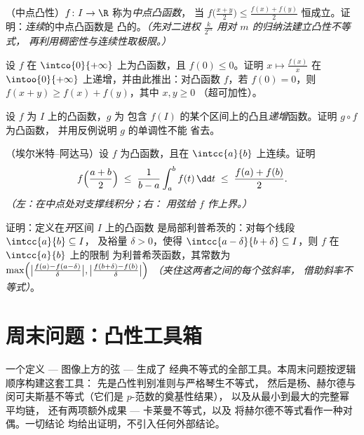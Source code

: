 \begin{exercise}[$\star\star\star$]\label{exo:b2:realfun:8}
（中点凸性）$f \colon I \to \R$ 称为\emph{中点凸函数}，
当 $f\bigl(\frac{x+y}{2}\bigr) \leq \frac{f(x) + f(y)}{2}$
恒成立。证明：\emph{连续}的中点凸函数是
凸的。\emph{（先对二进权
$\frac{k}{2^m}$ 用对 $m$ 的归纳法建立凸性不等式，
再利用稠密性与连续性取极限。）}
\end{exercise}

\begin{exercise}[$\star\star\star$]\label{exo:b2:realfun:9}
设 $f$ 在 $\intco{0}{+\infty}$ 上为凸函数，且 $f(0) \leq 0$。证明
$x \mapsto \frac{f(x)}{x}$ 在
$\intoo{0}{+\infty}$ 上递增，并由此推出：对凸函数 $f$，若 $f(0) =
0$，则 $f(x + y) \geq f(x) + f(y)$，其中 $x, y \geq 0$
（超可加性）。
\end{exercise}

\begin{exercise}[$\star$]\label{exo:b2:realfun:10}
设 $f$ 为 $I$ 上的凸函数，$g$ 为
包含 $f(I)$ 的某个区间上的凸且\emph{递增}函数。证明 $g \circ f$ 为凸函数，
并用反例说明 $g$ 的单调性不能
省去。
\end{exercise}

\begin{exercise}[$\star\star$]\label{exo:b2:realfun:11}
（埃尔米特–阿达马）设 $f$ 为凸函数，且在
$\intcc{a}{b}$ 上连续。证明
\[
f\Bigl(\frac{a+b}{2}\Bigr) \;\leq\; \frac{1}{b -
a}\int_a^b f(t)\,\dd t \;\leq\; \frac{f(a) + f(b)}{2} .
\]
\emph{（左：在中点处对支撑线积分；右：
用弦给 $f$ 作上界。）}
\end{exercise}

\begin{exercise}[$\star\star\star$]\label{exo:b2:realfun:12}
证明：定义在\emph{开}区间 $I$ 上的凸函数
是局部利普希茨的：对每个线段 $\intcc{a}{b} \subseteq I$，
及裕量 $\delta > 0$，使得 $\intcc{a - \delta}{b + \delta}
\subseteq I$，则 $f$ 在 $\intcc{a}{b}$ 上的限制
为利普希茨函数，其常数为
$\max\Bigl(\bigl|\frac{f(a) - f(a - \delta)}{\delta}\bigr|,
\bigl|\frac{f(b + \delta) - f(b)}{\delta}\bigr|\Bigr)$
\emph{（夹住这两者之间的每个弦斜率，
借助斜率不等式）}。
\end{exercise}

\section{周末问题：凸性工具箱}

一个定义 --- 图像上方的弦 --- 生成了
经典不等式的全部工具。本周末问题按逻辑顺序构建这套工具：
先是凸性判别准则与严格琴生不等式，
然后是杨、赫尔德与闵可夫斯基不等式（它们是 $p$-范数的奠基性结果），
以及从最小到最大的完整幂平均链，
还有两项额外成果 --- 卡莱曼不等式，以及
将赫尔德不等式看作一种对偶。一切结论
均给出证明，不引入任何外部结论。

